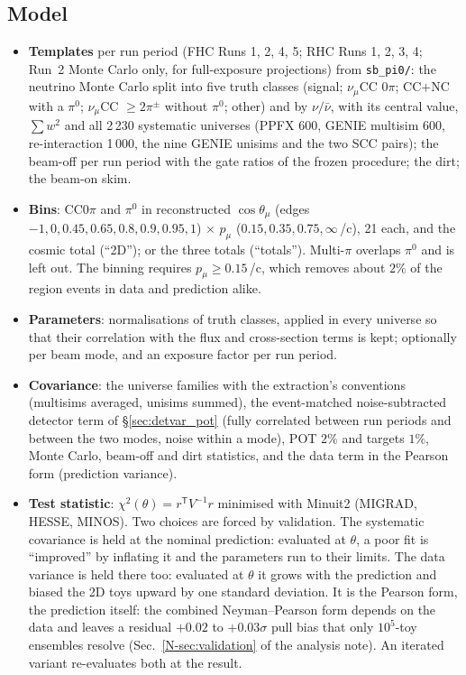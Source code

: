 \documentclass[11pt,a4paper]{article}
\newcommand{\noteref}[2]{#1~\ref{N-#2} of the analysis note}
\newcommand{\GeVc}{\,\text{GeV}\!/c}
\begin{document}
\subsection{Model}
\label{sec:fit_model}
\begin{itemize}\itemsep2pt
  \item \textbf{Templates} per run period (FHC Runs 1, 2, 4, 5; RHC Runs 1, 2, 3, 4; Run~2 Monte Carlo only, for
    full-exposure projections) from \texttt{sb\_pi0/}: the neutrino Monte Carlo split into five truth classes
    (signal; $\nu_\mu$CC $0\pi$; CC$+$NC with a $\pi^0$; $\nu_\mu$CC $\geq2\pi^\pm$ without $\pi^0$; other) and by
    $\nu/\bar\nu$, with its central value, $\sum w^2$ and all 2\,230 systematic universes (PPFX 600, GENIE
    multisim 600, re-interaction 1\,000, the nine GENIE unisims and the two SCC pairs); the beam-off per run period
    with the gate ratios of the frozen procedure; the dirt; the beam-on skim.
  \item \textbf{Bins}: CC$0\pi$ and $\pi^0$ in reconstructed $\cos\theta_\mu$ (edges $-1,0,0.45,0.65,0.8,0.9,0.95,1$)
    $\times$ $p_\mu$ ($0.15,0.35,0.75,\infty$\GeVc), 21 each, and the cosmic total (``2D''); or the three totals
    (``totals''). Multi-$\pi$ overlaps $\pi^0$ and is left out. The binning requires $p_\mu\ge0.15$\GeVc, which
    removes about $2\%$ of the region events in data and prediction alike.
  \item \textbf{Parameters}: normalisations of truth classes, applied in every universe so that their correlation
    with the flux and cross-section terms is kept; optionally per beam mode, and an exposure factor per run period.
  \item \textbf{Covariance}: the universe families with the extraction's conventions (multisims averaged, unisims
    summed), the event-matched noise-subtracted detector term of \S\ref{sec:detvar_pot} (fully correlated between
    run periods and between the two modes, noise within a mode), POT $2\%$ and targets $1\%$, Monte Carlo, beam-off
    and dirt statistics, and the data term in the Pearson form (prediction variance).
  \item \textbf{Test statistic}: $\chi^2(\theta)=r^{\mathsf T}V^{-1}r$ minimised with Minuit2 (MIGRAD, HESSE, MINOS).
    Two choices are forced by validation. The systematic covariance is held at the nominal prediction: evaluated
    at $\theta$, a poor fit is ``improved'' by inflating it and the parameters run to their limits. The data
    variance is held there too: evaluated at $\theta$ it grows with the prediction and biased the 2D toys upward by
    one standard deviation. It is the Pearson form, the prediction itself: the combined Neyman--Pearson form depends
    on the data and leaves a residual $+0.02$ to $+0.03\sigma$ pull bias that only $10^5$-toy ensembles resolve
    (\noteref{Sec.}{sec:validation}). An iterated variant re-evaluates both at the result.
\end{itemize}
\end{document}
